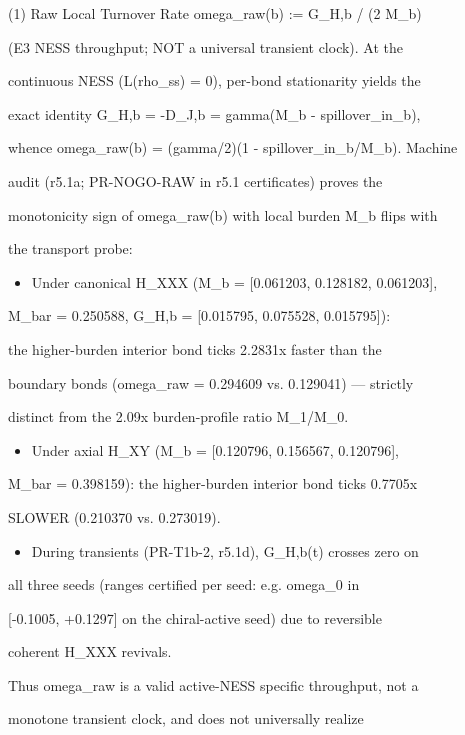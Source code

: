 \documentclass[11pt,a4paper]{article}
\theoremstyle{definition}
\begin{document}
(1) Raw Local Turnover Rate omega\_raw(b) := G\_{H,b} / (2 M\_b)

(E3 NESS throughput; NOT a universal transient clock). At the

continuous NESS (L(rho\_ss) = 0), per-bond stationarity yields the

exact identity G\_{H,b} = -D\_{J,b} = gamma(M\_b - spillover\_in\_b),

whence omega\_raw(b) = (gamma/2)(1 - spillover\_in\_b/M\_b). Machine

audit (r5.1a; PR-NOGO-RAW in r5.1 certificates) proves the

monotonicity sign of omega\_raw(b) with local burden M\_b flips with

the transport probe:


\begin{itemize}[leftmargin=1.4em]
\item Under canonical H\_XXX (M\_b = [0.061203, 0.128182, 0.061203],
\end{itemize}
    M\_bar = 0.250588, G\_{H,b} = [0.015795, 0.075528, 0.015795]):

    the higher-burden interior bond ticks 2.2831x faster than the

    boundary bonds (omega\_raw = 0.294609 vs. 0.129041) — strictly

    distinct from the 2.09x burden-profile ratio M\_1/M\_0.

\begin{itemize}[leftmargin=1.4em]
\item Under axial H\_XY (M\_b = [0.120796, 0.156567, 0.120796],
\end{itemize}
    M\_bar = 0.398159): the higher-burden interior bond ticks 0.7705x

    SLOWER (0.210370 vs. 0.273019).

\begin{itemize}[leftmargin=1.4em]
\item During transients (PR-T1b-2, r5.1d), G\_{H,b}(t) crosses zero on
\end{itemize}
    all three seeds (ranges certified per seed: e.g. omega\_0 in

    [-0.1005, +0.1297] on the chiral-active seed) due to reversible

    coherent H\_XXX revivals.


Thus omega\_raw is a valid active-NESS specific throughput, not a

monotone transient clock, and does not universally realize
\end{document}
